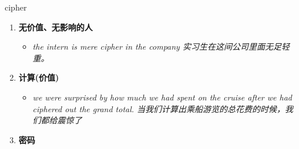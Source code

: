 
\begin{frame}
{\huge cipher}
\begin{center}
\begin{enumerate}\Large
  \item \textbf{无价值、无影响的人}
  \begin{itemize}
    \item \em{\Large{the intern is mere cipher in the company 实习生在这间公司里面无足轻重。}}
  \end{itemize}
  \item \textbf{计算(价值)}
  \begin{itemize}
    \item \em{\Large{we were surprised by how much we had spent on the cruise after we had ciphered out the grand total. 当我们计算出乘船游览的总花费的时候，我们都给震惊了}}
  \end{itemize}
  \item \textbf{密码}
\end{enumerate}
\end{center}
\end{frame}
